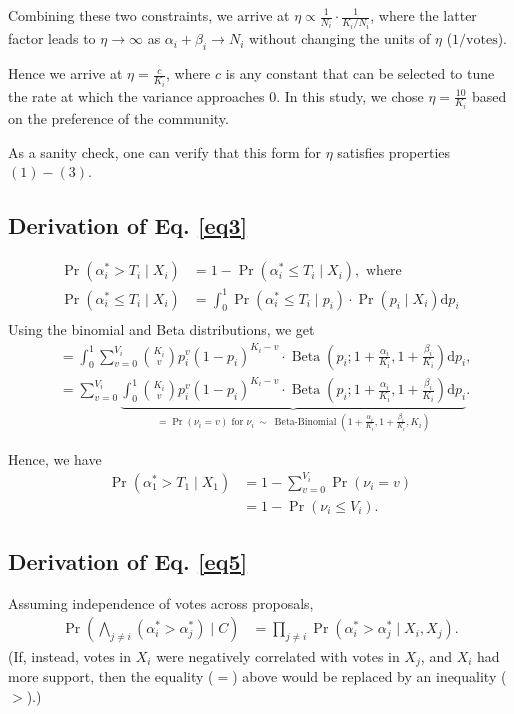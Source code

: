 \documentclass[format=acmsmall, review=true, screen=true, anonymous=true]{acmart}
\begin{document}
Combining these two constraints, we arrive at $\eta \propto \frac{1}{N_i}\cdot \frac{1}{K_i/N_i}$, where the latter factor leads to $\eta \rightarrow \infty$ as $\alpha_i + \beta_i \rightarrow N_i$ without changing the units of $\eta$ ($1/\text{votes}$).

Hence we arrive at $\eta = \frac{c}{K_i}$, where $c$ is any constant that can be selected to tune the rate at which the variance approaches $0$.  In this study, we chose $\eta = \frac{10}{K_i}$ based on the preference of the community.

As a sanity check, one can verify that this form for $\eta$ satisfies properties $(1)-(3)$.

\subsection*{Derivation of Eq. \eqref{eq3}}
\begin{align*}
\Pr(\alpha^*_i > T_i \mid X_i) &= 1 - \Pr(\alpha^*_i \leq T_i \mid X_i), \text{ where}\\
\Pr(\alpha^*_i \leq T_i \mid X_i) &= \int_0^1 \Pr(\alpha^*_i \leq T_i \mid p_i)\cdot \Pr(p_i \mid X_i) \mathrm{d}p_i\\
\end{align*}
Using the binomial and Beta distributions, we get
\begin{align*}
&= \int_0^1 \sum\limits_{v=0}^{V_i} {K_i \choose v} p_i^{v} {(1-p_i)}^{K_i-v} \cdot \operatorname{Beta}(p_i; 1+\frac{\alpha_i}{K_i},1+\frac{\beta_i}{K_i}) \mathrm{d}p_i,\\
&= \sum\limits_{v=0}^{V_i} \underbrace{\int_0^1 {K_i \choose v} p_i^{v} {(1-p_i)}^{K_i-v} \cdot \operatorname{Beta}(p_i; 1+\frac{\alpha_i}{K_i},1+\frac{\beta_i}{K_i}) \mathrm{d}p_i}_{= \Pr(\nu_i = v)\text{ for } \nu_i\ \sim\ \operatorname{Beta-Binomial}(1+\frac{\alpha_i}{K_i},1+\frac{\beta_i}{K_i}, K_i)}.
\end{align*}

Hence, we have
\begin{align*}
\Pr(\alpha^*_1 > T_1 \mid X_1) &= 1 - \sum\limits_{v=0}^{V_i} \Pr(\nu_i = v)\\
&= 1 - \Pr(\nu_i \leq V_i).
\end{align*}

\subsection*{Derivation of Eq. \eqref{eq5}}
Assuming independence of votes across proposals,
\begin{align*}
\Pr\left(\bigwedge_{j \neq i} (\alpha^*_i > \alpha^*_j) \mid C\right) &=\prod_{j \neq i} \Pr(\alpha^*_i > \alpha^*_j \mid X_i, X_j).
\end{align*}
(If, instead, votes in $X_i$ were negatively correlated with votes in $X_j$, and $X_i$ had more support, then the equality ($=$) above would be replaced by an inequality ($>$).)
\end{document}
